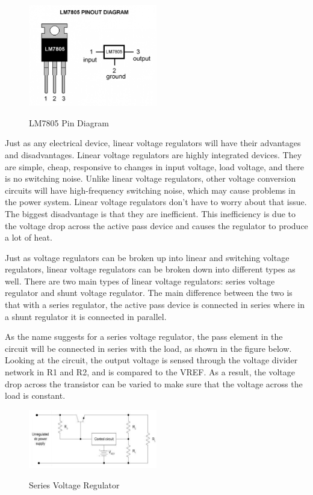 \begin{figure}[H]
    \caption{LM7805 Pin Diagram}
    \centering
    \includegraphics[width=0.5\textwidth]{images/LM7805_pin_diagram.png}
    \label{fig:LM7805-pin-diagram}
\end{figure}
Just as any electrical device, linear voltage regulators will have their advantages and disadvantages. Linear voltage regulators are highly integrated devices. They are simple, cheap, responsive to changes in input voltage, load voltage, and there is no switching noise. Unlike linear voltage regulators, other voltage conversion circuits will have high-frequency switching noise, which may cause problems in the power system. Linear voltage regulators don’t have to worry about that issue. The biggest disadvantage is that they are inefficient. This inefficiency is due to the voltage drop across the active pass device and causes the regulator to produce a lot of heat.\par
Just as voltage regulators can be broken up into linear and switching voltage regulators, linear voltage regulators can be broken down into different types as well. There are two main types of linear voltage regulators: series voltage regulator and shunt voltage regulator. The main difference between the two is that with a series regulator, the active pass device is connected in series where in a shunt regulator it is connected in parallel. \par
As the name suggests for a series voltage regulator, the pass element in the circuit will be connected in series with the load, as shown in the figure below. Looking at the circuit, the output voltage is sensed through the voltage divider network in R1 and R2, and is compared to the VREF. As a result, the voltage drop across the transistor can be varied to make sure that the voltage across the load is constant. \par
\begin{figure}[H]
    \caption{Series Voltage Regulator}
    \centering
    \includegraphics[width=0.5\textwidth]{images/Series_Voltage_Regulator.png}
    \label{fig:series-voltage-regulator}
\end{figure}
